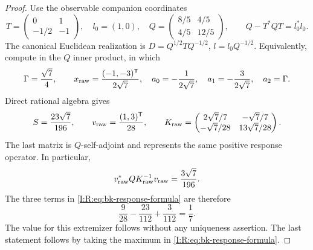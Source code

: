 \begin{proof}
Use the observable companion coordinates
\[
 T=\begin{pmatrix}0&1\\-1/2&-1\end{pmatrix},\quad
 l_0=(1,0),\quad
 Q=\begin{pmatrix}8/5&4/5\\4/5&12/5\end{pmatrix},
 \qquad Q-T^*QT=l_0^*l_0.
\]
The canonical Euclidean realization is
$D=Q^{1/2}TQ^{-1/2}$, $l=l_0Q^{-1/2}$.  Equivalently, compute in the
$Q$ inner product, in which
\[
 \Gamma=\frac{\sqrt7}{4},\qquad
 x_{\rm raw}=\frac{(-1,-3)^{\mathsf T}}{2\sqrt7},\quad
 a_0=-\frac1{2\sqrt7},\quad a_1=-\frac3{2\sqrt7},\quad a_2=\Gamma.
\]
Direct rational algebra gives
\[
 S=\frac{23\sqrt7}{196},\qquad
 v_{\rm raw}=\frac{(1,3)^{\mathsf T}}{28},\qquad
 K_{\rm raw}=\begin{pmatrix}
 2\sqrt7/7&-\sqrt7/7\\-\sqrt7/28&13\sqrt7/28
 \end{pmatrix}.
\]
The last matrix is $Q$-self-adjoint and represents the same positive
response operator.  In particular,
\[
 v_{\rm raw}^*QK_{\rm raw}^{-1}v_{\rm raw}=\frac{3\sqrt7}{196}.
\]
The three terms in \eqref{I:R:eq:bk-response-formula} are therefore
\[
 \frac9{28}-\frac{23}{112}+\frac3{112}=\frac17.
\]
The value for this extremizer follows without any uniqueness assertion.
The last statement follows by taking the maximum in
\eqref{I:R:eq:bk-response-formula}.
\end{proof}
